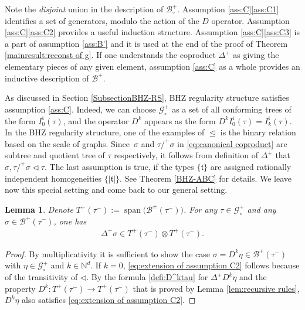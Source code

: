 \documentclass[10pt]{amsart}
\DeclareMathOperator{\Span}{span}
\theoremstyle{plain}
\newtheorem{lem}[thm]{Lemma}
\theoremstyle{definition}
\newcommand{\frkt}{\mathfrak{t}}
\let\pord\trianglelefteq
\let\spord\triangleleft
\newcommand{\bbN}{\mathbb{N}}
\newcommand{\mcB}{\mathcal{B}}
\newcommand{\mcG}{\mathcal{G}}
\begin{document}
Note the \emph{disjoint} union in the description of $\mcB_\circ^+$. Assumption \ref{ass:C}\eqref{ass:C1} identifies a set of generators, modulo the action of the $D$ operator. Assumption \ref{ass:C}\eqref{ass:C2} provides a useful induction structure. Assumption \ref{ass:C}\eqref{ass:C3} is a part of assumption \ref{ass:B'} and it is used at the end of the proof of Theorem \ref{mainresult:reconst of g}. If one understands the coproduct $\Delta^+$ as giving the elementary pieces of any given element, assumption \eqref{ass:C} as a whole provides an inductive description of $\mcB^+$.

As discussed in Section \ref{SubsectionBHZ-RS}, BHZ regularity structure satisfies assumption \eqref{ass:C}. Indeed, we can choose $\mcG_\circ^+$ as a set of all conforming trees of the form $I_0^{\mathfrak{t}}(\tau)$, and the operator $D^k$ appears as the form $D^kI_0^{\mathfrak{t}}(\tau)=I_k^{\mathfrak{t}}(\tau)$.
In the BHZ regularity structure, one of the examples of $\pord$ is the binary relation based on the scale of graphs.
Since~$\sigma$ and $\tau/^+\sigma$ in \eqref{eq:canonical coproduct} are subtree and quotient tree of $\tau$ respectively, it follows from definition of $\Delta^+$ that $\sigma,\tau/^+\sigma\spord\tau$.
The last assumption is true, if the types $\{\mathfrak{t}\}$ are assigned rationally independent homogeneities $\{|\frkt|\}$.
See Theorem \ref{BHZ-ABC} for details. We leave now this special setting and come back to our general setting.

\begin{lem}\label{extension of assumption C2}
Denote $T^+(\tau^-)\!:=\!\Span \bigl(\mcB^+(\tau^-)\bigr)$.
For any $\tau\!\in\!\mcG_\circ^+$ and any $\sigma\!\in\!\mcB^+(\tau^-)$, one has
\begin{align}\label{eq:extension of assumption C2}
\Delta^+\sigma\in T^+(\tau^-)\otimes T^+(\tau^-).
\end{align}
\end{lem}

\begin{proof}
By multiplicativity it is sufficient to show the case $\sigma=D^k\eta\in\mcB^+(\tau^-)$ with $\eta\in\mcG_\circ^+$ and $k\in\bbN^d$.
If $k=0$, \eqref{eq:extension of assumption C2} follows because of the transitivity of $\spord$.
By the formula \eqref{defi:D^ktau} for $\Delta^+D^k\eta$ and the property $D^k:T^+(\tau^-)\to T^+(\tau^-)$ that is proved by Lemma \ref{lem:recursive rules}, $D^k\eta$ also satisfies \eqref{eq:extension of assumption C2}.
\end{proof}
\end{document}
